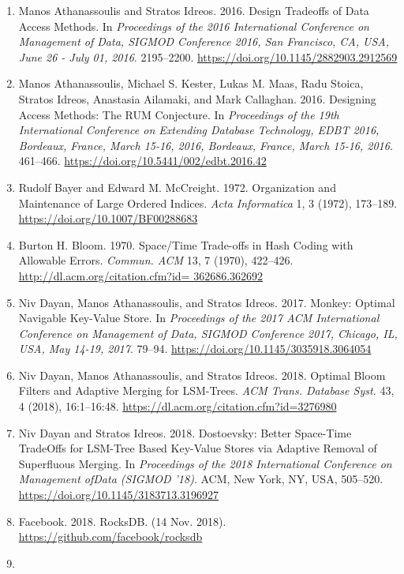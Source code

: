 \documentclass[a4paper,12pt,notitlepage,twoside,openright]{article}
\begin{document}
\begin{enumerate}
\def\labelenumi{\arabic{enumi}.}
\item
  Manos Athanassoulis and Stratos Idreos. 2016. Design Tradeoffs of Data
  Access Methods. In \emph{Proceedings of the 2016 International
  Conference on Management of Data, SIGMOD Conference 2016, San
  Francisco, CA, USA, June 26 - July 01, 2016}.
  2195--2200. \url{https://doi.org/10.1145/2882903.2912569}
\item
  Manos Athanassoulis, Michael S. Kester, Lukas M. Maas, Radu Stoica,
  Stratos Idreos, Anastasia Ailamaki, and Mark Callaghan. 2016.
  Designing Access Methods: The RUM Conjecture. In \emph{Proceedings of
  the 19th International Conference on Extending Database Technology, EDBT 2016, Bordeaux, France, March
  15-16, 2016, Bordeaux, France, March 15-16, 2016.} 461--466.
  \url{https://doi.org/10.5441/002/edbt.2016.42}
\item
  Rudolf Bayer and Edward M. McCreight. 1972. Organization and
  Maintenance of Large Ordered Indices. \emph{Acta Informatica} 1, 3
  (1972), 173--189.
  \url{https://doi.org/10.1007/BF00288683}
\item
  Burton H. Bloom. 1970. Space/Time Trade-offs in Hash Coding with
  Allowable Errors. \emph{Commun. ACM} 13, 7 (1970), 422--426.
  \href{http://dl.acm.org/citation.cfm?id=362686.362692}{http://dl.acm.org/citation.cfm?id=
  362686.362692}
\item
  Niv Dayan, Manos Athanassoulis, and Stratos Idreos. 2017. Monkey:
  Optimal Navigable Key-Value Store. In \emph{Proceedings of the 2017
  ACM International Conference on Management of Data, SIGMOD Conference
  2017, Chicago, IL, USA, May 14-19, 2017}. 79--94.
  \url{https://doi.org/10.1145/3035918.3064054}
\item
  Niv Dayan, Manos Athanassoulis, and Stratos Idreos. 2018. Optimal
  Bloom Filters and Adaptive Merging for LSM-Trees. \emph{ACM Trans.
  Database Syst.} 43, 4 (2018),
  16:1--16:48. \url{https://dl.acm.org/citation.cfm?id=3276980}
\item
  Niv Dayan and Stratos Idreos. 2018. Dostoevsky: Better Space-Time
  TradeOffs for LSM-Tree Based Key-Value Stores via Adaptive Removal of
  Superfluous Merging. In \emph{Proceedings of the 2018 International
  Conference on Management ofData (SIGMOD '18)}. ACM, New York, NY, USA, 505--520.
  \url{https://doi.org/10.1145/3183713.3196927}
\item
  Facebook. 2018. RocksDB. (14 Nov. 2018).
  \url{https://github.com/facebook/rocksdb}
\item

\end{enumerate}
\end{document}
